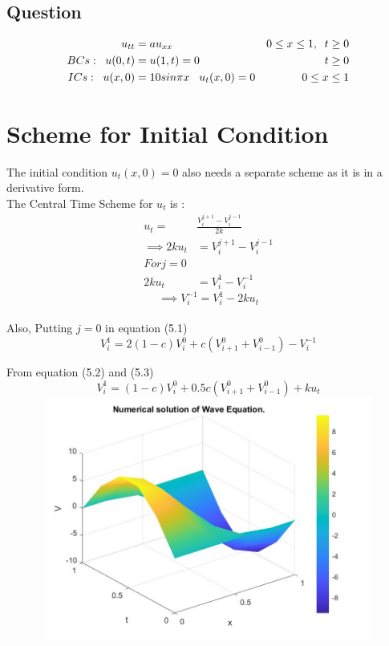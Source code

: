 \documentclass[a4paper,14pt,twoside,onecolumn,openany,final]{memoir}
\begin{document}
\subsection{Question}
\begin{align*}
    u_{tt} &= au_{xx}           &   0 \leq x \leq 1, \;\; t\geq 0\\
    BCs:\;\; u(0,t) &= u(1,t)=0   &   t \geq 0\\
    ICs:\;\; u(x,0)  &= 10sin{\pi}x \hspace{3mm} u_t(x,0)=0  &   0 \leq x \leq 1
\end{align*}

\clearpage

\section{Scheme for Initial Condition}
The initial condition \(u_t(x,0)=0\) also needs a separate scheme as it is in a derivative form.\\

The Central Time Scheme for \(u_t\) is :
\begin{align*}
  u_t =& \frac{V_i^{j+1} - V_i^{j-1}}{2k}\\
  \implies 2ku_t &= V_i^{j+1} - V_i^{j-1}\\
  For j=0 \\
  2ku_t &= V_i^1 - V_i^{-1}
\end{align*}
\begin{equation}
 \implies V_i^{-1} = V_i^1 - 2ku_t
\end{equation}
\\

Also, Putting \(j=0\) in equation (5.1)
\begin{equation}
  V_i^1= 2(1-c)V_i^0 +c(V_{i+1}^0+V_{i-1}^0)  - V_i^{-1}
\end{equation}

From equation (5.2) and (5.3)
\begin{equation}
    V_i^1 = (1-c)V_i^0 +0.5c(V_{i+1}^0+V_{i-1}^0)  +ku_t
  \end{equation}
  \vspace{5mm}
  \includegraphics[width=15cm, height=8cm]{wave.jpg}
\end{document}
